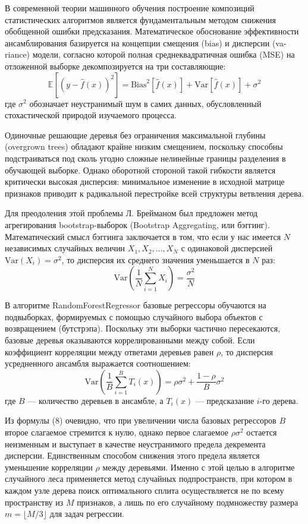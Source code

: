 \documentclass[14pt, a4paper]{extarticle}
\begin{document}
В современной теории машинного обучения построение композиций статистических алгоритмов является фундаментальным методом снижения обобщенной ошибки предсказания. Математическое обоснование эффективности ансамблирования базируется на концепции смещения (bias) и дисперсии (va- riance) модели, согласно которой полная среднеквадратичная ошибка (MSE) на отложенной выборке декомпозируется на три составляющие:
\begin{equation}
\mathbb{E}[(y - \hat{f}(x))^2] = \text{Bias}^2[\hat{f}(x)] + \text{Var}[\hat{f}(x)] + \sigma^2
\end{equation}
где $\sigma^2$ обозначает неустранимый шум в самих данных, обусловленный стохастической природой изучаемого процесса.

Одиночные решающие деревья без ограничения максимальной глубины (overgrown trees) обладают крайне низким смещением, поскольку способны подстраиваться под сколь угодно сложные нелинейные границы разделения в обучающей выборке. Однако оборотной стороной такой гибкости является критически высокая дисперсия: минимальное изменение в исходной матрице признаков приводит к радикальной перестройке всей структуры ветвления дерева. 

Для преодоления этой проблемы Л. Брейманом был предложен метод агрегирования bootstrap-выборок (Bootstrap Aggregating, или бэггинг). Математический смысл бэггинга заключается в том, что если у нас имеется $N$ независимых случайных величин $X_1, X_2, \dots, X_N$ с одинаковой дисперсией $\text{Var}(X_i) = \sigma^2$, то дисперсия их среднего значения уменьшается в $N$ раз:
\begin{equation}
\text{Var}\left(\frac{1}{N}\sum_{i=1}^N X_i\right) = \frac{\sigma^2}{N}
\end{equation}

В алгоритме RandomForestRegressor базовые регрессоры обучаются на подвыборках, формируемых с помощью случайного выбора объектов с возвращением (бутстрэпа). Поскольку эти выборки частично пересекаются, базовые деревья оказываются коррелированными между собой. Если коэффициент корреляции между ответами деревьев равен $\rho$, то дисперсия усредненного ансамбля выражается соотношением:
\begin{equation}
\text{Var}\left(\frac{1}{B}\sum_{i=1}^B T_i(x)\right) = \rho\sigma^2 + \frac{1-\rho}{B}\sigma^2
\end{equation}
где $B$ --- количество деревьев в ансамбле, а $T_i(x)$ --- предсказание $i$-го дерева. 

Из формулы (8) очевидно, что при увеличении числа базовых регрессоров $B$ второе слагаемое стремится к нулю, однако первое слагаемое $\rho\sigma^2$ остается неизменным и выступает в качестве неустранимого предела декремента дисперсии. Единственным способом снижения этого предела является уменьшение корреляции $\rho$ между деревьями. Именно с этой целью в алгоритме случайного леса применяется метод случайных подпространств, при котором в каждом узле дерева поиск оптимального сплита осуществляется не по всему пространству из $M$ признаков, а лишь по его случайному подмножеству размера $m = \lfloor M/3 \rfloor$ для задач регрессии.
\end{document}
